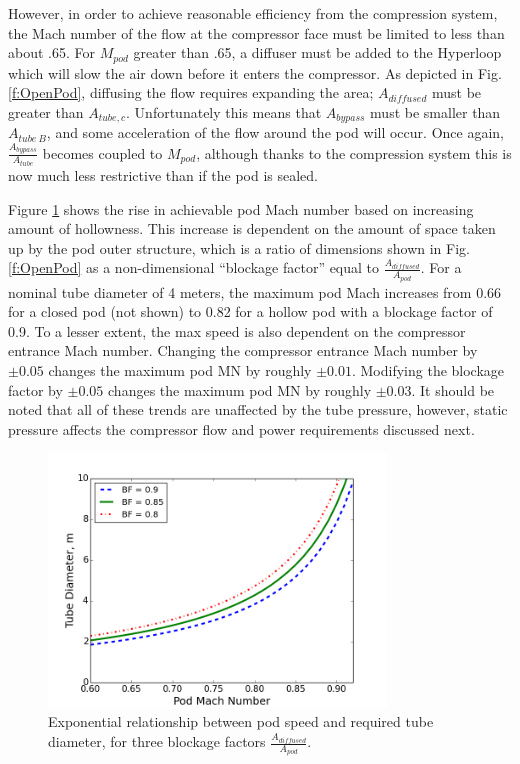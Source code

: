 \documentclass[heading.tex]{subfiles}
\begin{document}
However, in order to achieve reasonable efficiency from the compression system, the Mach number of the flow at the compressor face
must be limited to less than about .65. For $M_{pod}$ greater than .65, a diffuser must be added to the Hyperloop 
which will slow the air down before it enters the compressor. As depicted in Fig. \ref{f:OpenPod}, diffusing the flow 
requires expanding the area; $A_{diffused}$ must be greater than $A_{tube,c}$. Unfortunately this means that
$A_{bypass}$ must be smaller than $A_{tube\ B}$, and some acceleration of the flow around the pod will occur.
Once again, $\frac{A_{bypass}}{A_{tube}}$ becomes coupled to $M_{pod}$, although thanks to the compression 
system this is now much less restrictive than if the pod is sealed. 

Figure \ref{f:machRAD} shows the rise in achievable pod Mach number based on increasing amount of hollowness.
This increase is dependent on the amount of space taken up by the pod outer structure,
which is a ratio of dimensions shown in Fig. \ref{f:OpenPod}
as a non-dimensional ``blockage factor'' equal to $\frac{A_{diffused}}{A_{pod}}$.
For a nominal tube diameter of 4 meters, the maximum pod Mach increases from 0.66 for a closed pod (not shown)
to 0.82 for a hollow pod with a blockage factor of 0.9.
To a lesser extent, the max speed is also dependent on the compressor entrance Mach number.
Changing the compressor entrance Mach number by $\pm 0.05$ changes the maximum pod MN by roughly $\pm 0.01$. 
Modifying the blockage factor by $\pm 0.05$ changes the maximum pod MN by roughly $\pm 0.03$.
It should be noted that all of these trends are unaffected by the tube pressure,
however, static pressure affects the compressor flow and power requirements discussed next.


\begin{figure}[H]
\centering
\includegraphics[width=0.8\textwidth]{images/mach_vs_rad6.png}
\caption[Tube and Pod Radius vs Mach]{Exponential relationship between pod speed and required tube diameter, for three blockage factors $\frac{A_{diffused}}{A_{pod}}$.}
\label{f:machRAD}
\end{figure}
\end{document}
